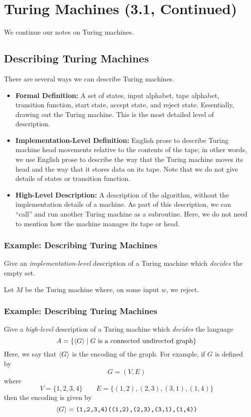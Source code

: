 \documentclass[letterpaper]{article}
\begin{document}
\section{Turing Machines (3.1, Continued)} 
We continue our notes on Turing machines. 

\subsection{Describing Turing Machines}
There are several ways we can describe Turing machines. 
\begin{itemize}
    \item \textbf{Formal Definition:} A set of states, input alphabet, tape alphabet, transition function, start state, accept state, and reject state. Essentially, drawing out the Turing machine. This is the most detailed level of description. 
    \item \textbf{Implementation-Level Definition:} English prose to describe Turing machine head movements relative to the contents of the tape; in other words, we use English prose to describe the way that the Turing machine moves its head and the way that it stores data on its tape. Note that we do not give details of states or transition function.
    \item \textbf{High-Level Description:} A description of the algorithm, without the implementation details of a machine. As part of this description, we can ``call'' and run another Turing machine as a subroutine. Here, we do not need to mention how the machine manages its tape or head.
\end{itemize}

\subsubsection{Example: Describing Turing Machines}
Give an \emph{implementation-level} description of a Turing machine which \emph{decides} the empty set. 

\begin{mdframed}[]
    Let $M$ be the Turing machine where, on some input $w$, we reject.
\end{mdframed}

\subsubsection{Example: Describing Turing Machines}
Give a \emph{high-level} description of a Turing machine which \emph{decides} the language 
\[A = \{\langle G \rangle \mid G \text{ is a connected undirected graph}\}\]
Here, we say that $\langle G \rangle$ is the encoding of the graph. For example, if $G$ is defined by 
\[G = (V, E)\]
where 
\[V = \{1, 2, 3, 4\} \qquad E = \{(1, 2), (2, 3), (3, 1), (1, 4)\}\]
then the encoding is given by 
\[\langle G \rangle = \texttt{(1,2,3,4)((1,2),(2,3),(3,1),(1,4))}\]
\end{document}
